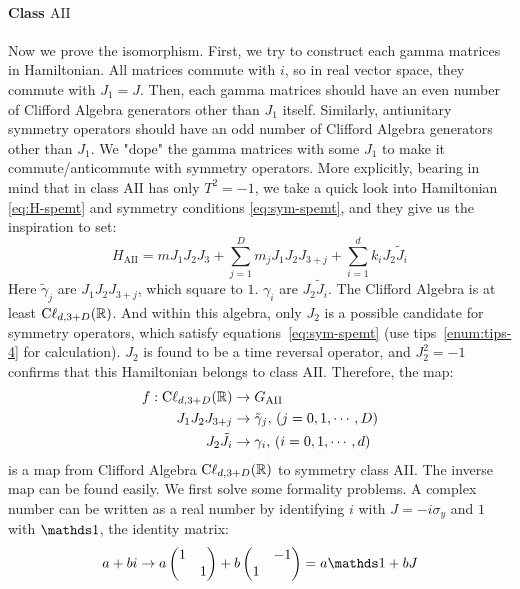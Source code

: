 \paragraph{Class $\mathrm{AII}$} Now we prove the isomorphism. First, we try to
construct each gamma matrices in Hamiltonian. All matrices commute with $i$, so
in real vector space, they commute with $J_1=J$. Then, each gamma matrices
should have an even number of Clifford Algebra generators other than $J_1$
itself. Similarly, antiunitary symmetry operators should have an odd number of
Clifford Algebra generators other than $J_1$. We "dope" the gamma matrices with
some $J_1$ to make it commute/anticommute with symmetry operators. More
explicitly, bearing in mind that in class $\mathrm{AII}$ has only $T^2=-1$, we
take a quick look into Hamiltonian \ref{eq:H-spemt} and symmetry conditions
\ref{eq:sym-spemt}, and they give us the inspiration to set:
\begin{equation}
    H_{\mathrm{AII}} = m J_1J_2J_3 + \sum_{j=1}^D m_jJ_1J_2J_{3+j} +
    \sum_{i=1}^d k_i J_2\tilde{J}_i
\end{equation}
Here $\tilde{\gamma}_j$ are $J_1J_2J_{3+j}$, which square to $1$. $\gamma_i$ are
$J_2\tilde{J}_i$. The Clifford Algebra is at least $\mathrm{C\ell}_{d,3+D}(\mathbb{R})$.
And within this algebra, only $J_2$ is a possible candidate for symmetry
operators, which satisfy equations~\ref{eq:sym-spemt} (use
tips~\ref{enum:tips-4} for calculation). $J_2$ is found to be a
time reversal operator, and $J_2^2=-1$ confirms that this Hamiltonian belongs to
class $\mathrm{AII}$. Therefore, the map:
\begin{align}
    f: \mathrm{C\ell}_{d,3+D}(\mathbb{R}) &\to G_{\mathrm{AII}} \\
    J_1J_2J_{3+j} &\to \tilde{\gamma}_j,\, (j=0,1,\cdots,D) \nonumber\\
    J_2 \tilde{J}_i &\to \gamma_i,\, (i=0,1,\cdots,d) \nonumber
\end{align}
is a map from Clifford Algebra $\mathrm{C\ell}_{d,3+D}(\mathbb{R})$ to symmetry class
$\mathrm{AII}$. The inverse map can be found easily. We first solve some
formality problems. A complex number can be written as a real number by
identifying $i$ with $J=-i\sigma_y$ and $1$ with $\id$, the identity matrix:
\begin{equation}
    a+bi \to a \begin{pmatrix}
        1 & \\ & 1
    \end{pmatrix} + b \begin{pmatrix}
         & -1 \\ 1 & 
    \end{pmatrix} = a\id + b J
\end{equation}
